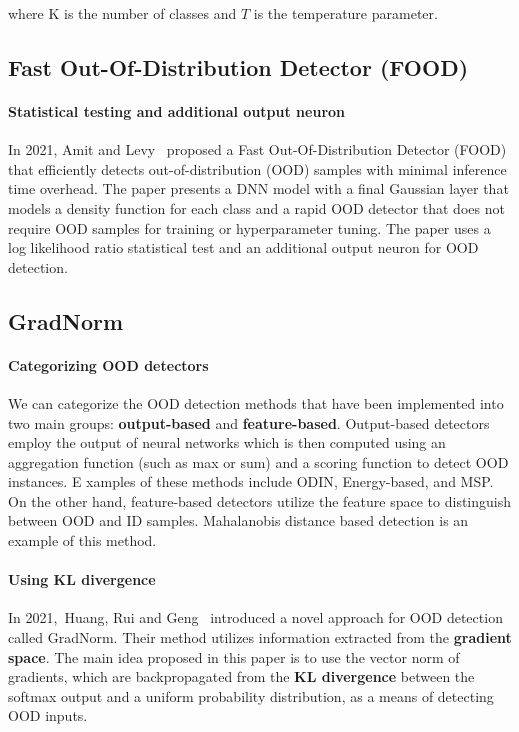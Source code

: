 where K is the number of classes and $T$ is the temperature parameter.

\subsection{Fast Out-Of-Distribution Detector (FOOD)}
\paragraph{Statistical testing and additional output neuron}
In 2021, Amit and Levy~\cite{Amit2020} proposed a Fast Out-Of-Distribution Detector (FOOD) that efficiently detects out-of-distribution (OOD) samples with minimal inference time overhead. 
The paper presents a DNN model with a final Gaussian layer that models a density function for each class and a rapid OOD detector that does not require OOD samples for training or hyperparameter tuning. 
The paper uses a log likelihood ratio statistical test and an additional output neuron for OOD detection.

\subsection{GradNorm}
\paragraph{Categorizing OOD detectors}
We can categorize the OOD detection methods that have been implemented into two main groups: \textbf{output-based} and \textbf{feature-based}. 
Output-based detectors employ the output of neural networks which is then computed using an aggregation function (such as max or sum) and a scoring function to detect OOD instances. E
xamples of these methods include ODIN\cite{Liang2017}, Energy-based\cite{liuEnergybasedOutofdistributionDetection2021}, and MSP\cite{Hendrycks2016}. 
On the other hand, feature-based detectors utilize the feature space to distinguish between OOD and ID samples. 
Mahalanobis distance based detection\cite{Lee2018} is an example of this method.

\paragraph{Using KL divergence}
In 2021,~Huang, Rui and Geng~\cite{huangImportanceGradientsDetecting2021} introduced a novel approach for OOD detection called GradNorm. 
Their method utilizes information extracted from the \textbf{gradient space}. 
The main idea proposed in this paper is to use the vector norm of gradients, which are backpropagated from the \textbf{KL divergence} between the softmax output 
and a uniform probability distribution, as a means of detecting OOD inputs. 

